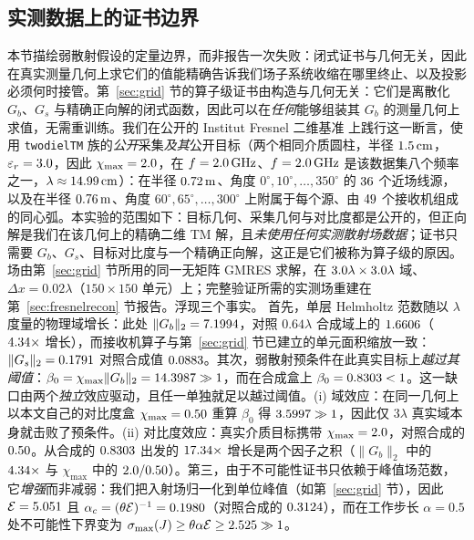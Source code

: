 \documentclass[UTF8,a4paper,11pt]{ctexart}
\newcommand{\norm}[1]{\lVert #1 \rVert}
\newcommand{\numv}[1]{#1}
\begin{document}
\subsection{实测数据上的证书边界}
\label{sec:fresnel}
本节描绘弱散射假设的定量边界，而非报告一次失败：闭式证书与几何无关，因此在真实测量几何上求它们的值能精确告诉我们场子系统收缩在哪里终止、以及投影必须何时接管。第~\ref{sec:grid} 节的算子级证书由构造与几何无关：它们是离散化 $G_b$、$G_s$ 与精确正向解的闭式函数，因此可以在\emph{任何}能够组装其 $G_b$ 的测量几何上求值，无需重训练。我们在公开的 Institut Fresnel 二维基准 \cite{fresnel_db} 上践行这一断言，使用 \texttt{twodielTM} 族的\emph{公开}采集\emph{及其}公开目标（两个相同介质圆柱，半径 $\numv{\NumFresnelRadiusCm}\,\mathrm{cm}$，$\varepsilon_r=\numv{\NumFresnelEpsR}$，因此 $\chi_{\max}=\numv{\NumFresnelChiMax}$，在 $f=\numv{\NumFresnelFreq}\,\mathrm{GHz}$、$f=\numv{\NumFresnelFreq}\,\mathrm{GHz}$ 是该数据集八个频率之一，$\lambda\approx\numv{\NumFresnelLamCm}\,\mathrm{cm}$）：在半径 $\numv{\NumFresnelPubRsM}\,\mathrm{m}$、角度 $0^\circ,10^\circ,\dots,350^\circ$ 的 $\numv{\NumFresnelPubNinc}$ 个近场线源，以及在半径 $\numv{\NumFresnelPubRrM}\,\mathrm{m}$、角度 $60^\circ,65^\circ,\dots,300^\circ$ 上附属于每个源、由 $\numv{\NumFresnelPubNrx}$ 个接收机组成的同心弧。本实验的范围如下：目标几何、采集几何与对比度都是公开的，但正向解是我们在该几何上的精确二维 TM 解，且\emph{未使用任何实测散射场数据}；证书只需要 $G_b$、$G_s$、目标对比度与一个精确正向解，这正是它们被称为算子级的原因。场由第~\ref{sec:grid} 节所用的同一无矩阵 GMRES 求解，在 $\numv{\NumFresnelDomainLam}\lambda\times\numv{\NumFresnelDomainLam}\lambda$ 域、$\Delta x=0.02\lambda$（$150\times150$ 单元）上；完整验证所需的实测场重建在第~\ref{sec:fresnelrecon} 节报告。浮现三个事实。
首先，单层 Helmholtz 范数随以 $\lambda$ 度量的物理域增长：此处 $\norm{G_b}_2=\numv{\NumFresnelGb}$，对照 $0.64\lambda$ 合成域上的 $\numv{\NumGridGbLo}$（$\numv{\NumFresnelGbRatio}\times$ 增长），而接收机算子与第~\ref{sec:grid} 节已建立的单元面积缩放一致：$\norm{G_s}_2=\numv{\NumFresnelPubGs}$ 对照合成值 $\numv{\NumGridGsLo}$。其次，弱散射预条件在此真实目标上\emph{越过其阈值}：$\beta_0=\chi_{\max}\norm{G_b}_2=\numv{\NumFresnelBeta}\gg1$，而在合成盒上 $\beta_0=\numv{\betacert}<1$。这一缺口由两个\emph{独立}效应驱动，且任一单独就足以越过阈值。(i) 域效应：在同一几何上以本文自己的对比度盒 $\chi_{\max}=\numv{\chimax}$ 重算 $\beta_0$ 得 $\numv{\NumFresnelBetaAtHalf}\gg1$，因此仅 $3\lambda$ 真实域本身就击败了预条件。(ii) 对比度效应：真实介质目标携带 $\chi_{\max}=\numv{\NumFresnelChiMax}$，对照合成的 $\numv{\chimax}$。从合成的 $\numv{\betacert}$ 出发的 $\numv{\NumFresnelBetaRatio}\times$ 增长是两个因子之积（$\norm{G_b}_2$ 中的 $\numv{\NumFresnelGbRatio}\times$ 与 $\chi_{\max}$ 中的 $\numv{\NumFresnelChiMax}/\numv{\chimax}$）。第三，由于不可能性证书只依赖于峰值场范数，它\emph{增强}而非减弱：我们把入射场归一化到单位峰值（如第~\ref{sec:grid} 节），因此 $\mathcal{E}=\numv{\NumFresnelPubEpeak}$ 且 $\alpha_c=(\theta\mathcal{E})^{-1}=\numv{\NumFresnelPubAlphaC}$（对照合成的 $\numv{\NumAlphaC}$），而在工作步长 $\alpha=0.5$ 处不可能性下界变为 $\sigma_{\max}(J)\ge\theta\alpha\mathcal{E}\ge\numv{\NumFresnelPubSigmaLB}\gg1$。
\end{document}
